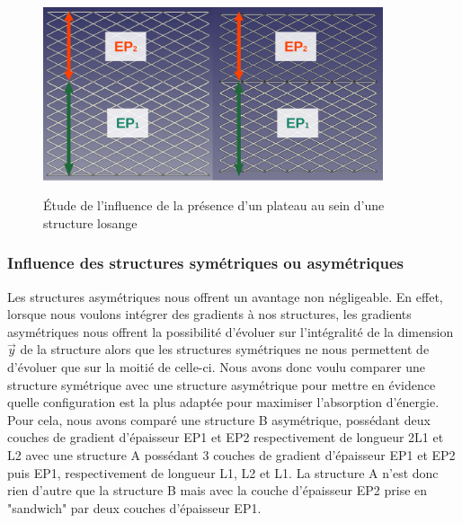 \documentclass[a4paper]{article}
\begin{document}
	\begin{figure}[H]
		\centering
		\includegraphics[width=10cm]{Images/6/plateaux/plateaux.pdf}\\
		\caption{ Étude de l’influence de la présence d'un plateau au sein d'une structure losange}
	\end{figure}
	\newpage
	
	\subsubsection{Influence des structures symétriques ou asymétriques}
	\hspace{0.5cm}Les structures asymétriques nous offrent un avantage non négligeable. En effet, lorsque nous voulons intégrer des gradients à nos structures, les gradients asymétriques nous offrent la possibilité d’évoluer sur l’intégralité de la dimension $\vec{y}$ de la structure alors que les structures symétriques ne nous permettent de d’évoluer que sur la moitié de celle-ci. Nous avons donc voulu comparer une structure symétrique avec une structure asymétrique pour mettre en évidence quelle configuration est la plus adaptée pour maximiser l'absorption d'énergie.\\
	
	Pour cela, nous avons comparé une structure B asymétrique, possédant deux couches de gradient d’épaisseur EP1 et EP2 respectivement de longueur 2L1 et L2 avec une structure A possédant 3 couches de gradient d’épaisseur EP1 et EP2 puis EP1, respectivement de longueur L1, L2 et L1. La structure A n'est donc rien d'autre que la structure B mais avec la couche d'épaisseur EP2 prise en "sandwich" par deux couches d'épaisseur EP1.
	
\end{document}
